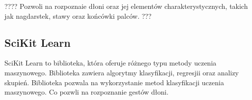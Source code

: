 ????
Pozwoli na rozpoznaie dłoni oraz jej elementów charakterystycznych, 
takich jak nagdarstek, stawy oraz końcówki palców. 
???


\subsection{SciKit Learn}

SciKit Learn to biblioteka, która oferuje różnego typu metody uczenia
maszynowego. Biblioteka zawiera algorytmy klasyfikacji, regresjii oraz 
analizy skupień. 
Biblioteka pozwala na wykorzystanie metod klasyfikacji uczenia maszynowego. 
Co pozwli na rozpoznanie gestów dłoni. 
